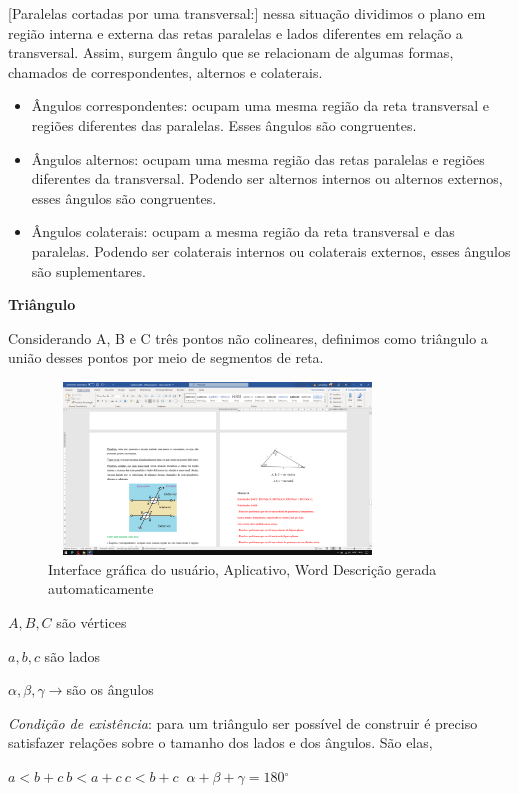 {[}Paralelas cortadas por uma transversal:{]} nessa situação dividimos o
plano em região interna e externa das retas paralelas e lados diferentes
em relação a transversal. Assim, surgem ângulo que se relacionam de
algumas formas, chamados de correspondentes, alternos e colaterais.

\begin{itemize}
\item
  Ângulos correspondentes: ocupam uma mesma região da reta transversal e
  regiões diferentes das paralelas. Esses ângulos são congruentes.
\item
  Ângulos alternos: ocupam uma mesma região das retas paralelas e
  regiões diferentes da transversal. Podendo ser alternos internos ou
  alternos externos, esses ângulos são congruentes.
\item
  Ângulos colaterais: ocupam a mesma região da reta transversal e das
  paralelas. Podendo ser colaterais internos ou colaterais externos,
  esses ângulos são suplementares.
\end{itemize}

\textbf{{Triângulo}}

Considerando A, B e C três pontos não colineares, definimos como
triângulo a união desses pontos por meio de segmentos de reta.

\begin{figure}
\centering
\includegraphics[width=3.53174in,height=1.806in]{./imgSAEB_7_MAT/media/image41.png}
\caption{Interface gráfica do usuário, Aplicativo, Word Descrição gerada
automaticamente}
\end{figure}

$A, B, C$ \rightarrow são vértices

$a, b, c$ \rightarrow são lados

$\alpha,\beta,\gamma \rightarrow $são os ângulos

\emph{Condição de existência}: para um triângulo ser possível de
construir é preciso satisfazer relações sobre o tamanho dos lados e dos
ângulos. São elas,

$ a < b + c\ b < a + c\ c < b + c\ $
$\alpha + \beta + \gamma = 180{^\circ}$

